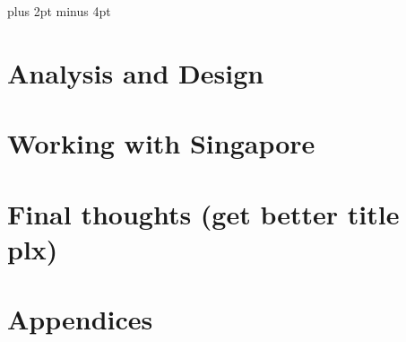 \documentclass[a4paper,titlepage]{article}
\begin{document}
\parindent=0pt %
\parskip=8pt plus 2pt minus 4pt

\setcounter{page}{1}

\tableofcontents
\newpage

\begin{spacing}{1.15}

\pagebreak

\section{Analysis and Design}







\pagebreak
\section{Working with Singapore}

\pagebreak
\section{Final thoughts (get better title plx)}

\end{spacing}
\pagebreak


\newpage
\appendix
\section{Appendices}

\end{document}
